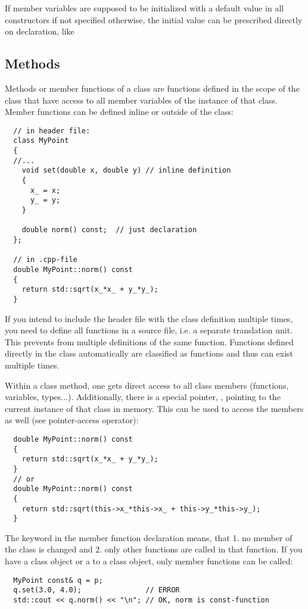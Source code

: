 If member variables are supposed to be initialized with a default value in all constructors if not specified otherwise, the initial value can be
prescribed directly on declaration, like 

\subsection{Methods}
Methods or member functions of a class are functions defined in the scope of the class that have access to all member variables of the instance of that class.
Member functions can be defined inline or outside of the class:
%
\begin{verbatim}
  // in header file:
  class MyPoint
  {
  //...
    void set(double x, double y) // inline definition
    {
      x_ = x;
      y_ = y;
    }

    double norm() const;  // just declaration
  };

  // in .cpp-file
  double MyPoint::norm() const
  {
    return std::sqrt(x_*x_ + y_*y_);
  }
\end{verbatim}

If you intend to include the header file with the class definition multiple times, you need to define all functions in a source file, i.e. a separate
translation unit. This prevents from multiple definitions of the same function. Functions defined directly in the class automatically are classified as
 functions and thus can exist multiple times.

Within a class method, one gets direct access to all class members (functions, variables, types...). Additionally, there is a special pointer, ,
pointing to the current instance of that class in memory. This can be used to access the members as well (see pointer-access operator):
%
\begin{verbatim}
  double MyPoint::norm() const
  {
    return std::sqrt(x_*x_ + y_*y_);
  }
  // or
  double MyPoint::norm() const
  {
    return std::sqrt(this->x_*this->x_ + this->y_*this->y_);
  }
\end{verbatim}

The keyword  in the member function declaration means, that 1. no member of the class is changed and 2. only other  functions are called
in that function. If you have a  class object or a  to a class object, only  member functions can be called:
%
\begin{verbatim}
  MyPoint const& q = p;
  q.set(3.0, 4.0);               // ERROR
  std::cout << q.norm() << "\n"; // OK, norm is const-function
\end{verbatim}

